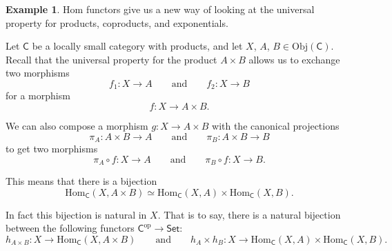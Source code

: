 \documentclass[a4paper,10pt]{scrreprt}
\newcommand{\Obj}{\mathrm{Obj}}
\newcommand{\Hom}{\mathrm{Hom}}
\theoremstyle{definition}
\newtheorem{example}{Example}[section]
\theoremstyle{plain}
\theoremstyle{remark}
\begin{document}
\begin{example}
  \label{eg:naturaltransformationsforcccs}
  Hom functors give us a new way of looking at the universal property for products, coproducts, and exponentials.

  Let $\mathsf{C}$ be a locally small category with products, and let $X$, $A$, $B \in \Obj(\mathsf{C})$. Recall that the universal property for the product $A \times B$ allows us to exchange two morphisms
  \begin{equation*}
    f_{1}\colon X \to A\qquad\text{and}\qquad f_{2}\colon X \to B
  \end{equation*}
  for a morphism
  \begin{equation*}
    f\colon X \to A \times B.
  \end{equation*}

  We can also compose a morphism $g\colon X \to A \times B$ with the canonical projections
  \begin{equation*}
    \pi_{A}\colon A \times B \to A \qquad\text{and}\qquad \pi_{B}\colon A \times B \to B
  \end{equation*}
  to get two morphisms
  \begin{equation*}
    \pi_{A} \circ f\colon X \to A\qquad\text{and}\qquad \pi_{B} \circ f\colon X \to B.
  \end{equation*}

  This means that there is a bijection 
  \begin{equation*}
    \Hom_{\mathsf{C}}(X, A \times B) \simeq \Hom_{\mathsf{C}}(X, A) \times \Hom_{\mathsf{C}}(X, B).
  \end{equation*}

  In fact this bijection is natural in $X$. That is to say, there is a natural bijection between the following functors $\mathsf{C}^{\mathrm{op}} \to \mathsf{Set}$:
  \begin{equation*}
    h_{A \times B}\colon X \to \Hom_{\mathsf{C}}(X, A \times B)\qquad\text{and}\qquad h_{A} \times h_{B}\colon X \to \Hom_{\mathsf{C}}(X, A) \times \Hom_{\mathsf{C}}(X, B).
  \end{equation*}


\end{example}
\end{document}

